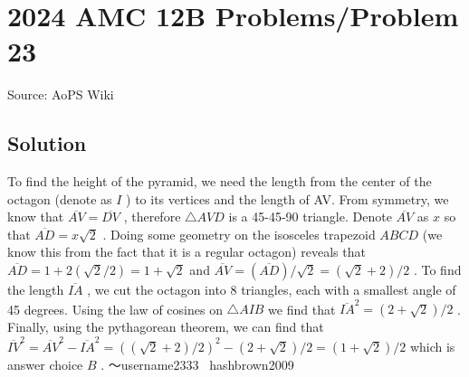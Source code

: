 \documentclass[12pt]{article}
\begin{document}
\section*{{2024 AMC 12B Problems/Problem 23}}
Source: AoPS Wiki

\subsection*{Solution}
To find the height of the pyramid, we need the length from the center of the octagon (denote as $I$ ) to its vertices and the length of AV. From symmetry, we know that $\overline{AV} = \overline{DV}$ , therefore $\triangle{AVD}$ is a 45-45-90 triangle. Denote $\overline{AV}$ as $x$ so that $\overline{AD} = x\sqrt{2}$ . Doing some geometry on the isosceles trapezoid $ABCD$ (we know this from the fact that it is a regular octagon) reveals that $\overline{AD}=1+2(\sqrt{2}/2)=1+\sqrt{2}$ and $\overline{AV}=(\overline{AD})/\sqrt{2}=(\sqrt{2}+2)/2$ . To find the length $\overline{IA}$ , we cut the octagon into 8 triangles, each with a smallest angle of 45 degrees. Using the law of cosines on $\triangle{AIB}$ we find that ${\overline{IA}}^2=(2+\sqrt{2})/2$ . Finally, using the pythagorean theorem, we can find that ${\overline{IV}}^2={\overline{AV}}^2-{\overline{IA}}^2= {((\sqrt{2}+2)/2)}^2 - (2+\sqrt{2})/2 = \boxed{(1+\sqrt{2})/2}$ which is answer choice $\boxed{B}$ . ～username2333
~hashbrown2009
\end{document}
